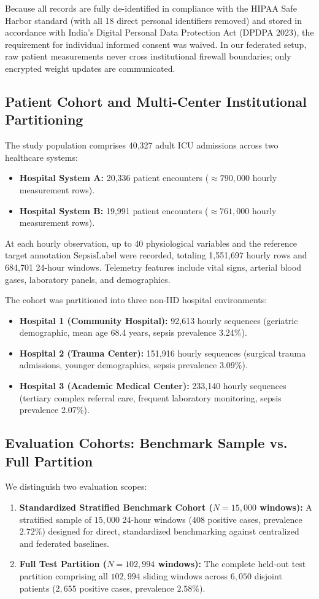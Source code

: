 \documentclass[11pt,a4paper]{article}
\begin{document}
Because all records are fully de-identified in compliance with the HIPAA Safe Harbor standard (with all 18 direct personal identifiers removed) and stored in accordance with India's Digital Personal Data Protection Act (DPDPA 2023), the requirement for individual informed consent was waived. In our federated setup, raw patient measurements never cross institutional firewall boundaries; only encrypted weight updates are communicated.

\subsection{Patient Cohort and Multi-Center Institutional Partitioning}
The study population comprises 40,327 adult ICU admissions across two healthcare systems:
\begin{itemize}
    \item \textbf{Hospital System A:} 20,336 patient encounters ($\approx 790,000$ hourly measurement rows).
    \item \textbf{Hospital System B:} 19,991 patient encounters ($\approx 761,000$ hourly measurement rows).
\end{itemize}
At each hourly observation, up to 40 physiological variables and the reference target annotation $\text{SepsisLabel}$ were recorded, totaling 1,551,697 hourly rows and 684,701 24-hour windows. Telemetry features include vital signs, arterial blood gases, laboratory panels, and demographics.

The cohort was partitioned into three non-IID hospital environments:
\begin{itemize}
    \item \textbf{Hospital 1 (Community Hospital):} 92,613 hourly sequences (geriatric demographic, mean age 68.4 years, sepsis prevalence 3.24\%).
    \item \textbf{Hospital 2 (Trauma Center):} 151,916 hourly sequences (surgical trauma admissions, younger demographics, sepsis prevalence 3.09\%).
    \item \textbf{Hospital 3 (Academic Medical Center):} 233,140 hourly sequences (tertiary complex referral care, frequent laboratory monitoring, sepsis prevalence 2.07\%).
\end{itemize}

\subsection{Evaluation Cohorts: Benchmark Sample vs. Full Partition}
We distinguish two evaluation scopes:
\begin{enumerate}
    \item \textbf{Standardized Stratified Benchmark Cohort ($N=15,000$ windows):} A stratified sample of $15,000$ 24-hour windows ($408$ positive cases, prevalence $2.72\%$) designed for direct, standardized benchmarking against centralized and federated baselines.
    \item \textbf{Full Test Partition ($N=102,994$ windows):} The complete held-out test partition comprising all $102,994$ sliding windows across $6,050$ disjoint patients ($2,655$ positive cases, prevalence $2.58\%$).
\end{enumerate}
\end{document}
